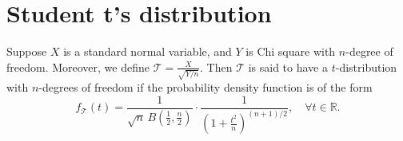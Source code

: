 \section{Student t's distribution}

\begin{theorem}[t-distribution]
    Suppose $X$ is a standard normal variable, and $Y$ is 
    Chi square with $n$-degree of freedom. Moreover, we define 
    $\mathcal{T} = \frac{X}{\sqrt{Y/n}}$.
    Then $\mathcal{T}$ is said to have a $t$-distribution with $n$-degrees
    of freedom if the probability density function is of the form
    \begin{equation}
        f_{\mathcal{T}}(t) = \frac{1}{\sqrt{n} \, B\left( \frac{1}{2}, \frac{n}{2} \right)} \cdot 
        \frac{1}{\displaystyle \left(1 + \frac{t^2}{n} \right)^{(n+1)/2}}, \quad \forall t \in \mathbb{R}.
    \end{equation}
\end{theorem}
